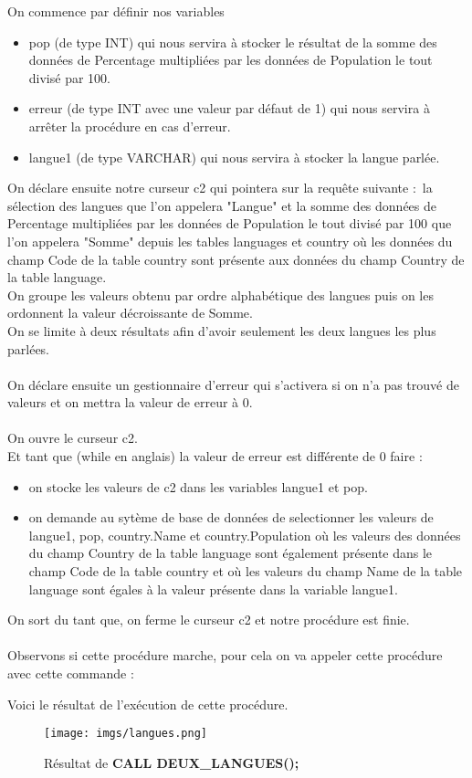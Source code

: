 \documentclass[11pt,a4paper]{article}
\begin{document}
On commence par définir nos variables
\begin{itemize}
	\item pop (de type INT) qui nous servira à stocker le résultat de la somme des données de Percentage multipliées par les données de Population le tout divisé par 100.
	\item erreur (de type INT avec une valeur par défaut de 1) qui nous servira à arrêter la procédure en cas d'erreur.
	\item langue1 (de type VARCHAR) qui nous servira à stocker la langue parlée.
\end{itemize}
On déclare ensuite notre curseur c2 qui pointera sur la requête suivante :~la sélection des langues que l'on appelera "Langue" et la somme des données de Percentage multipliées par les données de Population le tout divisé par 100 que l'on appelera "Somme" depuis les tables languages et country où les données du champ Code de la table country sont présente aux données du champ Country de la table language.\\
On groupe les valeurs obtenu par ordre alphabétique des langues puis on les ordonnent la valeur décroissante de Somme.\\
On se limite à deux résultats afin d'avoir seulement les deux langues les plus parlées.\\
\\
On déclare ensuite un gestionnaire d'erreur qui s'activera si on n'a pas trouvé de valeurs et on mettra la valeur de erreur à 0.\\
\\
On ouvre le curseur c2.\\
Et tant que (while en anglais) la valeur de erreur est différente de 0 faire :~
\begin{itemize}
	\item on stocke les valeurs de c2 dans les variables langue1 et pop.
	\item on demande au sytème de base de données de selectionner les valeurs de langue1, pop, country.Name et country.Population où les valeurs des données du champ Country de la table language sont également présente dans le champ Code de la table country et où les valeurs du champ Name de la table language sont égales à la valeur présente dans la variable langue1.
\end{itemize}
On sort du tant que, on ferme le curseur c2 et notre procédure est finie.\\
\\
Observons si cette procédure marche, pour cela on va appeler cette procédure avec cette commande :~



Voici le résultat de l'exécution de cette procédure.

\begin{figure}[ht]
	\centering
	\texttt{[image: imgs/langues.png]}
	\caption{Résultat de \textbf{CALL DEUX\_LANGUES();}}
	\label{fig13}
\end{figure}
\end{document}
